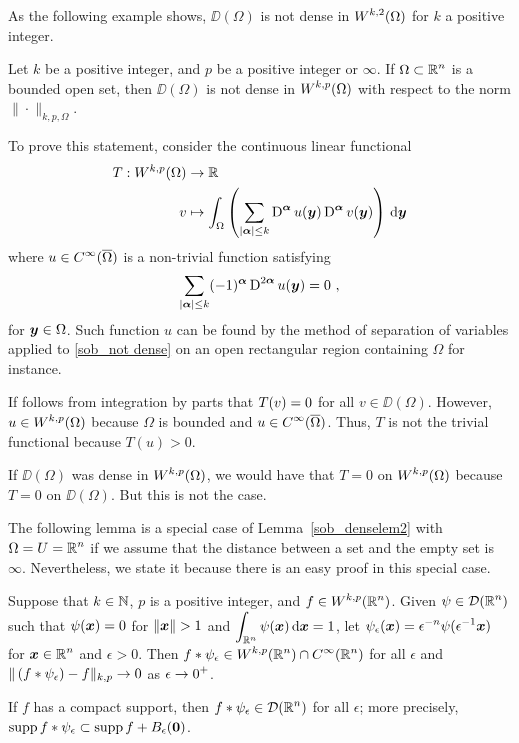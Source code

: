 As the following example shows, $\DD(\Omega)$ is not dense in
$\displaystyle W^{k,2}(\Omega)$ for $k$ a positive integer.

\begin{egg}
Let $k$ be a positive integer, and $p$ be a positive integer or $\infty$. 
If $\displaystyle \Omega \subset \mathbb{R}^n$ is a bounded open set, then
$\DD(\Omega)$ is not dense in $\displaystyle W^{k,p}(\Omega)$ with
respect to the norm $\|\cdot\|_{k,p,\Omega}$.

To prove this statement, consider the continuous linear functional
\begin{align*}
T: W^{k,p}(\Omega) & \rightarrow \mathbb{R} \\
v &\mapsto \int_{\Omega} \left( \sum_{|{\bm{\alpha}}|\leq k}
\operatorname{D}^{{\bm{\alpha}}} u({\bm{y}})
\operatorname{D}^{{\bm{\alpha}}} v({\bm{y}})\right) \,\mathrm{d}{{\bm{y}}}
\end{align*}
where $\displaystyle u \in C^\infty(\overline{\Omega})$ is a
non-trivial function satisfying
\begin{equation} \label{sob_not dense}
\sum_{|{\bm{\alpha}}|\leq k} (-1)^{{\bm{\alpha}}} \operatorname{D}^{2{\bm{\alpha}}}
u({\bm{y}}) = 0 \ ,
\end{equation}
for ${\bm{y}} \in \Omega$.  Such function $u$ can be found by the
method of separation of variables applied to \ref{sob_not dense} on an
open rectangular region containing $\Omega$ for instance.

If follows from integration by parts that
$\displaystyle T(v)=0$ for all $v\in \DD(\Omega)$.
However, $\displaystyle u \in W^{k,p}(\Omega)$ because $\Omega$ is bounded and
$\displaystyle u \in C^\infty(\overline{\Omega})$.  Thus,
$T$ is not the trivial functional because $T(u) >0$.

If $\DD(\Omega)$ was dense in $\displaystyle W^{k,p}(\Omega)$, we
would have that $T=0$ on $\displaystyle W^{k,p}(\Omega)$ because $T=0$ on
$\DD(\Omega)$.  But this is not the case.
\end{egg}

The following lemma is a special case of Lemma~\ref{sob_denselem2}
with $\displaystyle \Omega = U = \mathbb{R}^n$ if we assume that the distance
between a set and the empty set is $\infty$.  Nevertheless, we state
it because there is an easy proof in this special case.

\begin{lemma} \label{sob_denselem5}
Suppose that $k\in \mathbb{N}$, $p$ is a positive integer, and
$\displaystyle f \in W^{k,p}(\mathbb{R}^n)$.
Given $\displaystyle \psi \in \mathcal{D}(\mathbb{R}^n)$ such that
$\psi({\bm{x}}) = 0$ for $\|\VEC{x}\|>1$ and
$\displaystyle \int_{\mathbb{R}^n} \psi({\bm{x}})\,\mathrm{d}{{\bm{x}}} = 1$, let
$\displaystyle \psi_\epsilon({\bm{x}}) = \epsilon^{-n} \psi(\epsilon^{-1}{\bm{x}})$
for $\displaystyle {\bm{x}} \in \mathbb{R}^n$ and $\epsilon > 0$.
Then
$\displaystyle f\ast \psi_{\epsilon} \in W^{k,p}(\mathbb{R}^n) \cap C^\infty(\mathbb{R}^n)$
for all
$\epsilon$ and $\displaystyle \| \left( f \ast \psi_{\epsilon} \right)
- f\|_{k,p} \rightarrow 0$ as $\displaystyle \epsilon \rightarrow 0^+$.

If $f$ has a compact support, then
$\displaystyle f \ast \psi_{\epsilon} \in \mathcal{D}(\mathbb{R}^n)$ for all $\epsilon$;
more precisely,
$\operatorname{supp} f\ast \psi_\epsilon \subset \operatorname{supp} f + B_\epsilon({\bm{0}})$.
\end{lemma}


